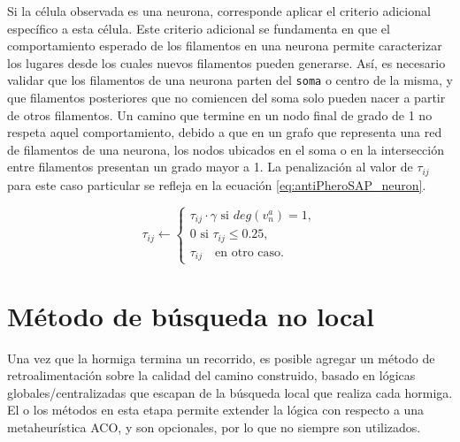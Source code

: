 Si la c\'elula observada es una neurona, corresponde aplicar el criterio adicional espec\'ifico a esta c\'elula. Este criterio adicional se fundamenta en que el comportamiento esperado de los filamentos en una neurona permite caracterizar los lugares desde los cuales nuevos filamentos pueden generarse. As\'i, es necesario validar que los filamentos de una neurona parten del {\tt soma} o centro de la misma, y que filamentos posteriores que no comiencen del soma solo pueden nacer a partir de otros filamentos. Un camino que termine en un nodo final de grado de 1 no respeta aquel comportamiento, debido a que en un grafo que representa una red de filamentos de una neurona, los nodos ubicados en el soma o en la intersecci\'on entre filamentos presentan un grado mayor a 1. La penalizaci\'on al valor de $\tau_{ij}$ para este caso particular se refleja en la ecuaci\'on \ref{eq:antiPheroSAP_neuron}.

\begin{equation}
    \tau_{ij} \leftarrow
        \begin{cases}
         \tau_{ij} \cdot \gamma \text{ si } deg(v^{a}_{n}) = 1,  \\[3ex]
        
        \text{0 si } \tau_{ij} \leq 0.25, \\[3ex]
        \tau_{ij} \quad \text{en otro caso}.
        \end{cases}
    \label{eq:antiPheroSAP_neuron}
\end{equation}




\section{M\'etodo de b\'usqueda no local}
\label{sec:nonLocalSearch}
Una vez que la hormiga termina un recorrido, es posible agregar un m\'etodo de retroalimentaci\'on sobre la calidad del camino construido, basado en l\'ogicas globales/centralizadas que escapan de la b\'usqueda local que realiza cada hormiga. El o los m\'etodos en esta etapa permite extender la l\'ogica con respecto a una metaheur\'istica ACO, y son opcionales, por lo que no siempre son utilizados. 

